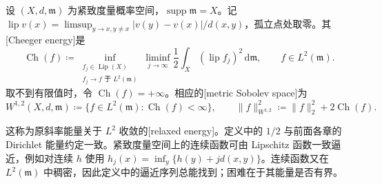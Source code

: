 \begin{definition}\label{g3:def:cheeger-energy}
	设 \((X,d,\mathfrak m)\) 为紧致度量概率空间，\(\operatorname{supp}\mathfrak m=X\)。记 \(\operatorname{lip}v(x)=\limsup_{y\to x,y\ne x}|v(y)-v(x)|/d(x,y)\)，孤立点处取零。其[Cheeger energy]是
	\begin{equation}\label{g3:eq:cheeger-relaxation}
		\operatorname{Ch}(f)\coloneqq
		\inf_{\substack{f_j\in\operatorname{Lip}(X)\\f_j\to f\text{ 于 }L^2(\mathfrak m)}}
		\liminf_{j\to\infty}\frac12\int_X(\operatorname{lip}f_j)^2\,\mathrm d\mathfrak m,
		\qquad f\in L^2(\mathfrak m).
	\end{equation}
	取不到有限值时，令 \(\operatorname{Ch}(f)=+\infty\)。相应的[metric Sobolev space]为
	\[
		W^{1,2}(X,d,\mathfrak m)\coloneqq
		\{f\in L^2(\mathfrak m):\operatorname{Ch}(f)<\infty\},
		\qquad
		\|f\|_{W^{1,2}}^2\coloneqq\|f\|_2^2+2\operatorname{Ch}(f).
	\]
\end{definition}

这称为原斜率能量关于 \(L^2\) 收敛的[relaxed energy]。定义中的 \(1/2\) 与前面各章的 Dirichlet 能量约定一致。紧致度量空间上的连续函数可由 Lipschitz 函数一致逼近，例如对连续 \(h\) 使用 \(h_j(x)=\inf_y\{h(y)+jd(x,y)\}\)。连续函数又在 \(L^2(\mathfrak m)\) 中稠密，因此定义中的逼近序列总能找到；困难在于其能量是否有界。

